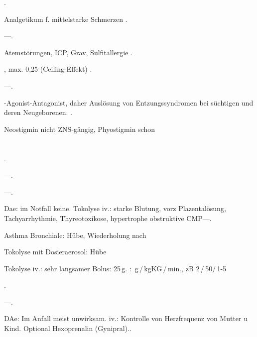 {

\begin{MedikamentCharakteristika}
  \item[{\TxItemSpezialitaeten}]  .
  \item[Beschreibung]  Analgetikum f. mittelstarke Schmerzen .
  \item[{\TxItemIndikation}] ---.
  \item[{\TxItemKontraindikation}]  Atemstörungen,  ICP, 
  Grav, Sulfitallergie .
  \item[{\TxItemDosierung}]  \MgKg*, max. 0,25\MgKg
  (Ceiling-Effekt) .
  \item[{\TxItemCave}] ---.
  \item[Anm]  {\textmu}-Agonist-Antagonist, daher Auslösung von 
  Entzungssyndromen
bei süchtigen und deren Neugeborenen. .
\end{MedikamentCharakteristika}}
{}


{
Neostigmin nicht ZNS-gängig, Phyostigmin schon}




\section{}



{
\begin{MedikamentCharakteristika}
  \item[{\TxItemSpezialitaeten}] .
  \item[Beschreibung] ---.
  \item[{\TxItemIndikation}] ---.
  \item[{\TxItemKontraindikation}]  Dae: im Notfall keine. Tokolyse 
  iv.: starke Blutung, vorz
  Plazentalösung, Tachyarrhythmie, Thyreotoxikose, hypertrophe 
  obstruktive
  CMP---.
  \item[{\TxItemDosierung}]
  \begin{inparaitem}
  \item 
  Asthma Bronchiale:  Hübe, Wiederholung nach
  \item Tokolyse mit Dosieraerosol:  Hübe
  \item Tokolyse iv.: sehr langsamer Bolus: 25\,{\textmu}g.
  : \,{\textmu}g\,/\,kgKG\,/\,min., zB
  2\Mg\,/\,50\Ml*/\,1-5 
  \end{inparaitem}.
  \item[{\TxItemCave}] ---.
  \item[Anm] DAe: Im Anfall meist unwirksam. iv.: Kontrolle von 
  Herzfrequenz von Mutter u
  Kind. Optional Hexoprenalin (Gynipral)..
\end{MedikamentCharakteristika}}
{}





